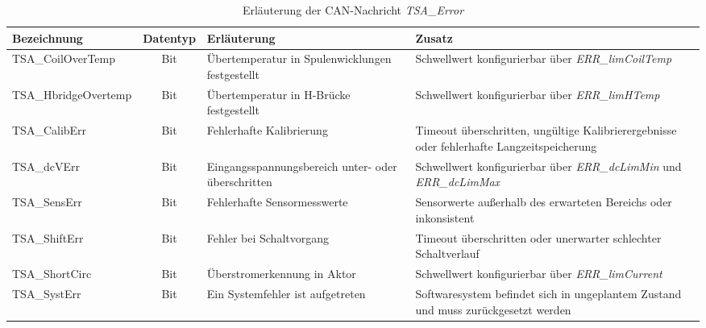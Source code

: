 \begin{table}%
\centering
\begin{tabular}{l c p{6cm} p{4cm}}
\hline
Bezeichnung & Datentyp & Erläuterung & Zusatz \\
\hline
TSA\_CoilOverTemp & Bit & Übertemperatur in Spulenwicklungen festgestellt & Schwellwert konfigurierbar über \textit{ERR\_limCoilTemp} \newline \\
TSA\_HbridgeOvertemp & Bit & Übertemperatur in H-Brücke festgestellt & Schwellwert konfigurierbar über \textit{ERR\_limHTemp} \newline \\
TSA\_CalibErr & Bit & Fehlerhafte Kalibrierung & Timeout überschritten, ungültige Kalibrierergebnisse oder fehlerhafte Langzeitspeicherung \newline \\
TSA\_dcVErr & Bit &  Eingangsspannungsbereich unter- oder überschritten & Schwellwert konfigurierbar über \textit{ERR\_dcLimMin} und \textit{ERR\_dcLimMax} \newline \\
TSA\_SensErr & Bit & Fehlerhafte Sensormesswerte & Sensorwerte außerhalb des erwarteten Bereichs oder inkonsistent \newline \\
TSA\_ShiftErr & Bit & Fehler bei Schaltvorgang & Timeout überschritten oder unerwarter schlechter Schaltverlauf \newline \\
TSA\_ShortCirc & Bit &  Überstromerkennung in Aktor & Schwellwert konfigurierbar über \textit{ERR\_limCurrent} \newline \\
TSA\_SystErr& Bit & Ein Systemfehler ist aufgetreten & Softwaresystem befindet sich in ungeplantem Zustand und muss zurückgesetzt werden \newline \\

\end{tabular}
\caption{Erläuterung der CAN-Nachricht \textit{TSA\_Error}}
\label{tab_tsa_error}
\end{table}